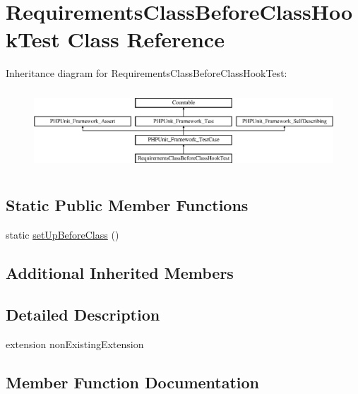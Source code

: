 \hypertarget{class_requirements_class_before_class_hook_test}{}\section{Requirements\+Class\+Before\+Class\+Hook\+Test Class Reference}
\label{class_requirements_class_before_class_hook_test}
Inheritance diagram for Requirements\+Class\+Before\+Class\+Hook\+Test\+:\begin{figure}[H]
\begin{center}
\leavevmode
\includegraphics[height=3.022942cm]{class_requirements_class_before_class_hook_test}
\end{center}
\end{figure}
\subsection*{Static Public Member Functions}
\begin{DoxyCompactItemize}
\item 
static \mbox{\hyperlink{class_requirements_class_before_class_hook_test_a80ef9eb20e7443b38276fb4647985fb7}{set\+Up\+Before\+Class}} ()
\end{DoxyCompactItemize}
\subsection*{Additional Inherited Members}


\subsection{Detailed Description}
extension non\+Existing\+Extension 

\subsection{Member Function Documentation}
\mbox{\label{class_requirements_class_before_class_hook_test_a80ef9eb20e7443b38276fb4647985fb7}} 
